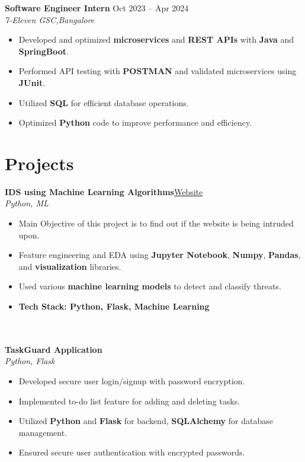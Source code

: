 \documentclass[a4paper,10pt]{article}
\begin{document}
\noindent\textbf{Software Engineer Intern}\href{https://7-elevengsc.com/}{\faLink} \hfill Oct 2023 -- Apr 2024 \\
\noindent\textit{7-Eleven GSC,Bangalore} 

\begin{itemize}[leftmargin=0.15in]
    \setlength{\itemsep}{0.05em} %
    \setlength{\parskip}{0em}    %
    \item Developed and optimized \textbf{microservices} and \textbf{REST APIs} with \textbf{Java} and \textbf{SpringBoot}.
       \item Performed API testing with \textbf{POSTMAN} and validated microservices using \textbf{JUnit}.
    \item Utilized \textbf{SQL} for efficient database operations.
    \item Optimized \textbf{Python} code to improve performance and efficiency. 
\end{itemize}

\section*{Projects}
\noindent\textbf{IDS using Machine Learning Algorithms}\href{https://github.com/Mallikarjun9353/}{Website} \hfill  \\
\noindent\textit{Python, ML} 
\begin{itemize}[leftmargin=0.15in]
    \setlength{\itemsep}{0.05em} %
    \setlength{\parskip}{0em}    %
    \item Main Objective of this project is to find out if the website is being intruded upon.
    \item Feature engineering and EDA using \textbf{Jupyter Notebook}, \textbf{Numpy}, \textbf{Pandas}, and \textbf{visualization} libraries.
    \item Used various \textbf{machine learning models} to detect and classify threats.
    \item \textbf{Tech Stack: Python, Flask, Machine Learning}
\end{itemize}
\\
\\
\noindent\textbf{TaskGuard Application} \hfill \\
\noindent\textit{Python, Flask}
\begin{itemize}[leftmargin=0.15in, itemsep=0.1em]
    \setlength{\itemsep}{0.05em} %
    \setlength{\parskip}{0em}    %
    \item Developed secure user login/signup with password encryption.
    \item Implemented to-do list feature for adding and deleting tasks.
    \item Utilized \textbf{Python} and \textbf{Flask} for backend, \textbf{SQLAlchemy} for database management.
    \item Ensured secure user authentication with encrypted passwords.
\end{itemize}
\end{document}
